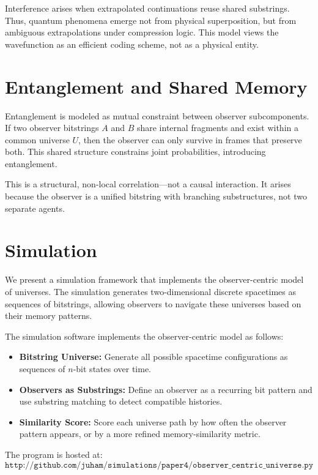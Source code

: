 \documentclass[12pt]{article}
\begin{document}
Interference arises when extrapolated continuations reuse shared substrings. Thus, quantum phenomena emerge not from physical superposition, but from ambiguous extrapolations under compression logic. This model views the wavefunction as an efficient coding scheme, not as a physical entity.

\section{Entanglement and Shared Memory}

Entanglement is modeled as mutual constraint between observer subcomponents. If two observer bitstrings $A$ and $B$ share internal fragments and exist within a common universe $U$, then the observer can only survive in frames that preserve both. This shared structure constrains joint probabilities, introducing entanglement.

This is a structural, non-local correlation—not a causal interaction. It arises because the observer is a unified bitstring with branching substructures, not two separate agents.

\section{Simulation}

We present a simulation framework that implements the observer-centric model of universes. The simulation generates two-dimensional discrete spacetimes as sequences of bitstrings, allowing observers to navigate these universes based on their memory patterns.

The simulation software implements the observer-centric model as follows:

\begin{itemize}
    \item \textbf{Bitstring Universe:} Generate all possible spacetime configurations as sequences of $n$-bit states over time.
    \item \textbf{Observers as Substrings:} Define an observer as a recurring bit pattern and use substring matching to detect compatible histories.
    \item \textbf{Similarity Score:} Score each universe path by how often the observer pattern appears, or by a more refined memory-similarity metric.
\end{itemize}

The program is hosted at:
\[
    \texttt{http://github.com/juham/simulations/paper4/observer\_centric\_universe.py}
\]
\end{document}
